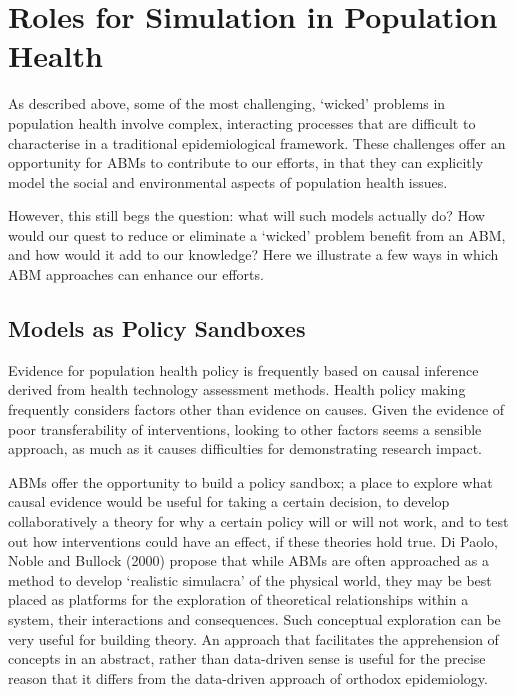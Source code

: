 \documentclass[review]{elsarticle}
\begin{document}
\section{Roles for Simulation in Population Health}

As described above, some of the most challenging, `wicked' problems in population health involve complex, interacting processes that are difficult to characterise in a traditional epidemiological framework.  These challenges offer an opportunity for ABMs to contribute to our efforts, in that they can explicitly model the social and environmental aspects of population health issues.

However, this still begs the question: what will such models actually do?  How would our quest to reduce or eliminate a `wicked' problem benefit from an ABM, and how would it add to our knowledge?  Here we illustrate a few ways in which ABM approaches can enhance our efforts.

\subsection{Models as Policy Sandboxes}

Evidence for population health policy is frequently based on causal inference derived from health technology assessment methods. Health policy making frequently considers factors other than evidence on causes. Given the evidence of poor transferability of interventions, looking to other factors seems a sensible approach, as much as it causes difficulties for demonstrating research impact.  

ABMs offer the opportunity to build a policy sandbox; a place to explore what causal evidence would be useful for taking a certain decision, to develop collaboratively a theory for why a certain policy will or will not work, and to test out how interventions could have an effect, if these theories hold true. Di Paolo, Noble and Bullock (2000) propose that while ABMs are often approached as a method to develop `realistic simulacra' of the physical world, they may be best placed as platforms for the exploration of theoretical relationships within a system, their interactions and consequences. Such conceptual exploration can be very useful for building theory. An approach that facilitates the apprehension of concepts in an abstract, rather than data-driven sense is useful for the precise reason that it differs from the data-driven approach of orthodox epidemiology. 
\end{document}
